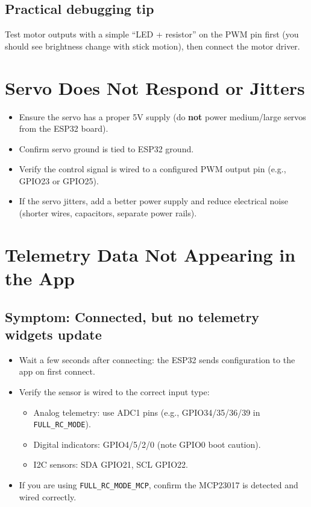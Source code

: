 \subsection*{Practical debugging tip}
Test motor outputs with a simple ``LED + resistor'' on the PWM pin first (you should see brightness change with stick motion),
then connect the motor driver.

\section{Servo Does Not Respond or Jitters}
\label{sec:servo}

\begin{itemize}
    \item Ensure the servo has a proper 5V supply (do \textbf{not} power medium/large servos from the ESP32 board).
    \item Confirm servo ground is tied to ESP32 ground.
    \item Verify the control signal is wired to a configured PWM output pin (e.g., GPIO23 or GPIO25).
    \item If the servo jitters, add a better power supply and reduce electrical noise (shorter wires, capacitors, separate power rails).
\end{itemize}

\section{Telemetry Data Not Appearing in the App}
\label{sec:telemetry}

\subsection*{Symptom: Connected, but no telemetry widgets update}
\begin{itemize}
    \item Wait a few seconds after connecting: the ESP32 sends configuration to the app on first connect.
    \item Verify the sensor is wired to the correct input type:
    \begin{itemize}
        \item Analog telemetry: use ADC1 pins (e.g., GPIO34/35/36/39 in \texttt{FULL\_RC\_MODE}).
        \item Digital indicators: GPIO4/5/2/0 (note GPIO0 boot caution).
        \item I2C sensors: SDA GPIO21, SCL GPIO22.
    \end{itemize}
    \item If you are using \texttt{FULL\_RC\_MODE\_MCP}, confirm the MCP23017 is detected and wired correctly.
\end{itemize}

